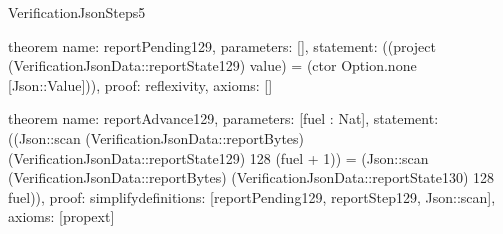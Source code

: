 \begin{lexlean}{VerificationJsonSteps5}
\begin{semanticmodule}
theorem{
  name: reportPending129,
  parameters: [],
  statement: ((project (VerificationJsonData::reportState129) value) = (ctor Option.none [Json::Value])),
  proof: reflexivity{},
  axioms: []
}

theorem{
  name: reportAdvance129,
  parameters: [fuel : Nat],
  statement: ((Json::scan (VerificationJsonData::reportBytes) (VerificationJsonData::reportState129) 128 (fuel + 1)) = (Json::scan (VerificationJsonData::reportBytes) (VerificationJsonData::reportState130) 128 fuel)),
  proof: simplify{definitions: [reportPending129, reportStep129, Json::scan]},
  axioms: [propext]
}

\end{semanticmodule}
\end{lexlean}
